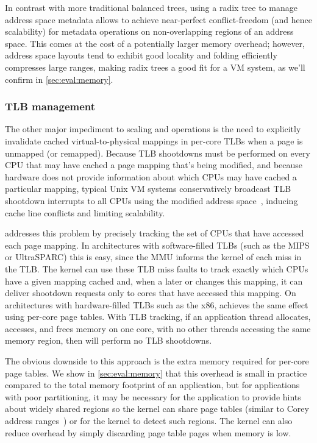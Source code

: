 In contrast with more traditional balanced trees, using a radix tree
to manage address space metadata allows \vm to achieve near-perfect
conflict-freedom (and hence scalability) for metadata operations on
non-overlapping regions of an address
space.  This comes at the cost of a potentially larger memory
overhead; however, address space layouts tend to exhibit good
locality and folding efficiently compresses large ranges, making radix
trees a good fit for a VM system, as we'll confirm in
\cref{sec:eval:memory}.

\subsubsection{TLB management}
\label{sec:radixvm:tlb}

The other major impediment to scaling  and 
operations is the need to explicitly invalidate cached
virtual-to-physical mappings in per-core TLBs when a page is unmapped
(or remapped).
%
Because TLB shootdowns must be performed on every CPU that may have
cached a page mapping that's being modified, and because hardware does
not provide
information about which CPUs may have cached a particular mapping,
typical Unix VM systems conservatively broadcast TLB shootdown
interrupts to all
CPUs using the modified address space~\cite{mach:tlb}, inducing cache
line conflicts
and limiting scalability.

\vm addresses this problem by precisely tracking the set of CPUs that
have accessed each page mapping.
%
In architectures with software-filled TLBs (such as the MIPS or
UltraSPARC) this is easy, since the MMU informs the kernel of each
miss in the TLB.  The kernel can use these TLB miss faults to track
exactly which CPUs have a given mapping cached and, when a later
 or  changes this mapping, it can deliver
shootdown requests
only to cores that have accessed this mapping.  On architectures
with hardware-filled TLBs such as the x86, \vm achieves the
same effect using per-core page tables.
%
With TLB tracking, if an application thread
allocates, accesses, and frees memory on one core, with no other threads
accessing the same memory region, then \vm will perform no TLB shootdowns.

The obvious downside to this approach is the extra memory required for
per-core page tables.  We show in \cref{sec:eval:memory} that this
overhead is small in practice compared to the total memory footprint
of an application, but for applications with poor partitioning, it may
be necessary for the application to provide hints about widely shared
regions so the kernel can share page tables (similar to Corey address
ranges~\cite{boyd-wickizer:corey}) or for the kernel to detect such
regions.
%
The kernel can also reduce overhead by simply discarding page table
pages when memory is low.

